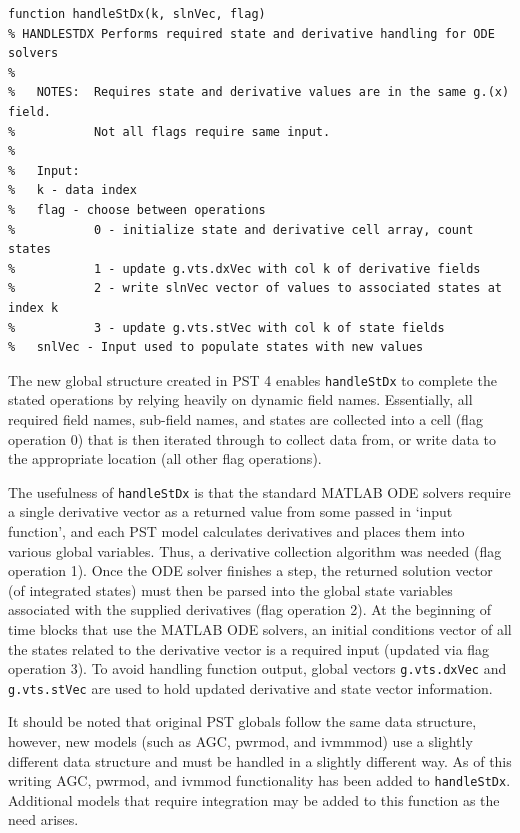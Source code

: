 \begin{lstlisting}[caption={Function Header for handleStDx},label={lst: handleStDx}]
\end{lstlisting}\vspace{-2 em}
\begin{verbatim}
function handleStDx(k, slnVec, flag)
% HANDLESTDX Performs required state and derivative handling for ODE solvers
%
%   NOTES:  Requires state and derivative values are in the same g.(x) field.
%           Not all flags require same input.
%
%   Input:
%   k - data index
%   flag - choose between operations
%           0 - initialize state and derivative cell array, count states
%           1 - update g.vts.dxVec with col k of derivative fields
%           2 - write slnVec vector of values to associated states at index k
%           3 - update g.vts.stVec with col k of state fields
%   snlVec - Input used to populate states with new values
\end{verbatim}

The new global structure created in PST 4 enables \verb|handleStDx| to complete the stated operations by relying heavily on dynamic field names. 
Essentially, all required field names, sub-field names, and states are collected into a cell (flag operation 0) that is then iterated through to collect data from, or write data to the appropriate location (all other flag operations).

The usefulness of \verb|handleStDx| is that the standard MATLAB ODE solvers require a single derivative vector as a returned value from some passed in `input function', and each PST model calculates derivatives and places them into various global variables. 
Thus, a derivative collection algorithm was needed (flag operation 1).
Once the ODE solver finishes a step, the returned solution vector (of integrated states) must then be parsed into the global state variables associated with the supplied derivatives (flag operation 2).
At the beginning of time blocks that use the MATLAB ODE solvers, an initial conditions vector of all the states related to the derivative vector is a required input (updated via flag operation 3).
To avoid handling function output, global vectors \verb|g.vts.dxVec| and \verb|g.vts.stVec| are used to hold updated derivative and state vector information.

It should be noted that original PST globals follow the same data structure,
however, new models (such as AGC, pwrmod, and ivmmmod) use a slightly different data structure and must be handled in a slightly different way.
As of this writing AGC, pwrmod, and ivmmod functionality has been added to \verb|handleStDx|.
Additional models that require integration may be added to this function as the need arises.





